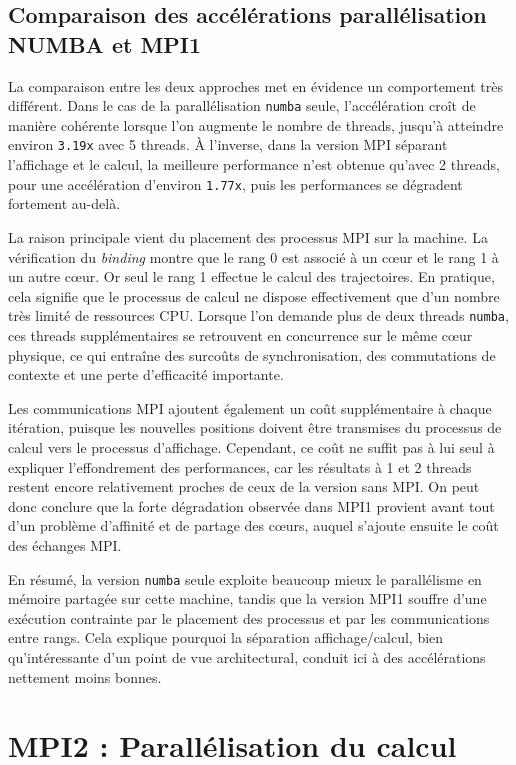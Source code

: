\documentclass[11pt,a4paper]{article}
\begin{document}
\subsection{Comparaison des accélérations parallélisation NUMBA et MPI1}

La comparaison entre les deux approches met en évidence un comportement très différent. Dans le cas de la parallélisation \texttt{numba} seule, l'accélération croît de manière cohérente lorsque l'on augmente le nombre de threads, jusqu'à atteindre environ \texttt{3.19x} avec 5 threads. À l'inverse, dans la version MPI séparant l'affichage et le calcul, la meilleure performance n'est obtenue qu'avec 2 threads, pour une accélération d'environ \texttt{1.77x}, puis les performances se dégradent fortement au-delà.

La raison principale vient du placement des processus MPI sur la machine. La vérification du \textit{binding} montre que le rang 0 est associé à un cœur et le rang 1 à un autre cœur. Or seul le rang 1 effectue le calcul des trajectoires. En pratique, cela signifie que le processus de calcul ne dispose effectivement que d'un nombre très limité de ressources CPU. Lorsque l'on demande plus de deux threads \texttt{numba}, ces threads supplémentaires se retrouvent en concurrence sur le même cœur physique, ce qui entraîne des surcoûts de synchronisation, des commutations de contexte et une perte d'efficacité importante.

Les communications MPI ajoutent également un coût supplémentaire à chaque itération, puisque les nouvelles positions doivent être transmises du processus de calcul vers le processus d'affichage. Cependant, ce coût ne suffit pas à lui seul à expliquer l'effondrement des performances, car les résultats à 1 et 2 threads restent encore relativement proches de ceux de la version sans MPI. On peut donc conclure que la forte dégradation observée dans MPI1 provient avant tout d'un problème d'affinité et de partage des cœurs, auquel s'ajoute ensuite le coût des échanges MPI.

En résumé, la version \texttt{numba} seule exploite beaucoup mieux le parallélisme en mémoire partagée sur cette machine, tandis que la version MPI1 souffre d'une exécution contrainte par le placement des processus et par les communications entre rangs. Cela explique pourquoi la séparation affichage/calcul, bien qu'intéressante d'un point de vue architectural, conduit ici à des accélérations nettement moins bonnes.

\section{MPI2 : Parallélisation du calcul}
\end{document}
